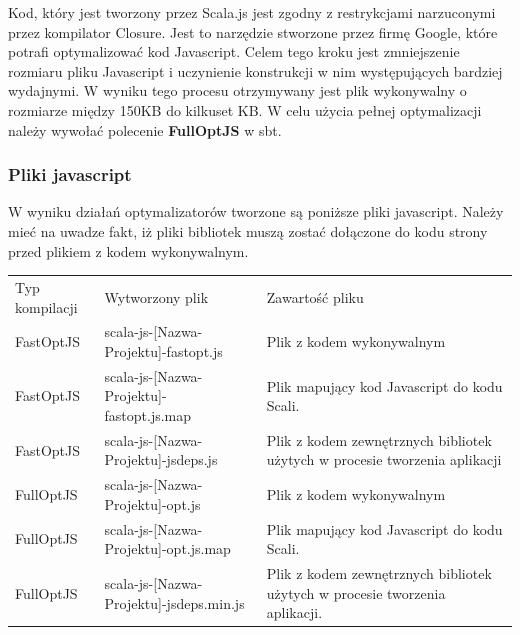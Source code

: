 Kod, który jest tworzony przez Scala.js jest zgodny z restrykcjami narzuconymi przez kompilator Closure\cite{Closure}. Jest to narzędzie stworzone przez firmę Google, które potrafi optymalizować kod Javascript.\cite{ClosureCompiler} Celem tego kroku jest zmniejszenie rozmiaru pliku Javascript i uczynienie konstrukcji w nim występujących bardziej wydajnymi.
W wyniku tego procesu otrzymywany jest plik wykonywalny o rozmiarze między 150KB do kilkuset KB\cite{ScalaCompilationProcess}.
W celu użycia pełnej optymalizacji należy wywołać polecenie \textbf{FullOptJS} w sbt.

\subsubsection{Pliki javascript}

W wyniku działań optymalizatorów tworzone są poniższe pliki javascript. Należy mieć na uwadze fakt, iż pliki bibliotek muszą zostać dołączone do kodu strony przed plikiem z kodem wykonywalnym.

\begin{center}
\begin{tabular}{| l | l | p{6cm} |}
\hline
Typ kompilacji & Wytworzony plik & Zawartość pliku \\ \Xhline{3\arrayrulewidth}

FastOptJS & scala-js-[Nazwa-Projektu]-fastopt.js & Plik z kodem wykonywalnym \\ \hline

FastOptJS & scala-js-[Nazwa-Projektu]-fastopt.js.map & Plik mapujący kod Javascript do kodu Scali. \\ \hline

FastOptJS & scala-js-[Nazwa-Projektu]-jsdeps.js & Plik z kodem zewnętrznych bibliotek użytych w procesie tworzenia aplikacji \\ \hline

 \Xhline{2\arrayrulewidth}

FullOptJS & scala-js-[Nazwa-Projektu]-opt.js & Plik z kodem wykonywalnym \\ \hline

FullOptJS & scala-js-[Nazwa-Projektu]-opt.js.map & Plik mapujący kod Javascript do kodu Scali. \\ \hline

FullOptJS & scala-js-[Nazwa-Projektu]-jsdeps.min.js & Plik z kodem zewnętrznych bibliotek użytych w procesie tworzenia aplikacji. \\ \hline
\end{tabular}
\end{center}
